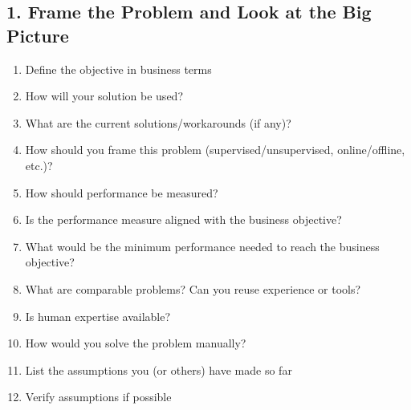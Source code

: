 
\begin{slide}
  \section[-2]{1. Frame the Problem and Look at the Big Picture}

  \begin{PauseHighLight}
  \begin{enumerate}\squeeze
  \item Define the objective in business terms\pause
  \item How will your solution be used?\pause
  \item What are the current solutions/workarounds (if any)?\pause
  \item How should you frame this problem (supervised/unsupervised,
    online/offline, etc.)?\pause
  \item How should performance be measured?\pause
  \item Is the performance measure aligned with the business
    objective?\pause
  \item What would be the minimum performance needed to reach the
    business objective?\pause
  \item What are comparable problems? Can you reuse experience or
    tools?\pause
  \item Is human expertise available?\pause
  \item How would you solve the problem manually?\pause
  \item List the assumptions you (or others) have made so far\pause
  \item Verify assumptions if possible\pause
  \end{enumerate}
\end{PauseHighLight}

\end{slide}


